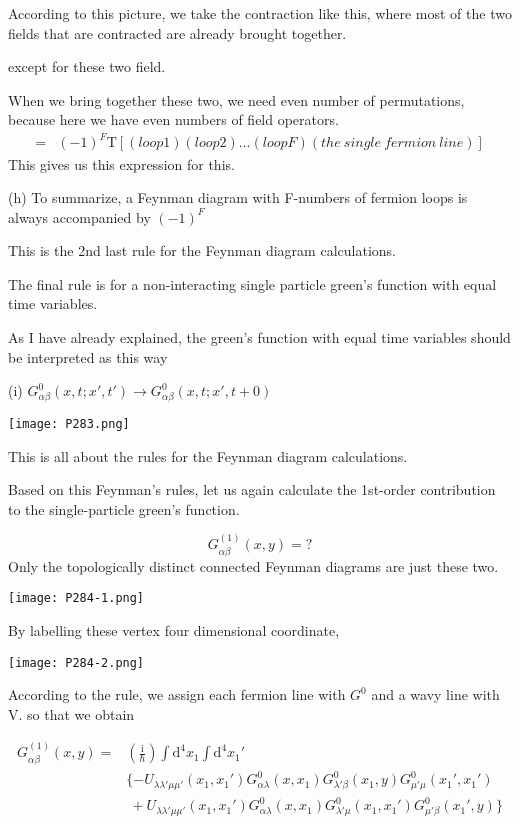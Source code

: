 According to this picture, we take the contraction like this, where most of the two fields that are contracted are already brought together.

except for these two field.

When we bring together these two, we need even number of permutations, because here we have even numbers of field operators.
\begin{align}
=&(-1)^F\mathrm{T}[(loop1)(loop2)...(loopF)(the\ single\ fermion\ line)]\nonumber
\end{align}
This gives us this expression for this.

(h) To summarize, a Feynman diagram with F-numbers of fermion loops is always accompanied by $(-1)^F$

This is the 2nd last rule for the Feynman diagram calculations.

The final rule is for a non-interacting single particle green's function with equal time variables.

As I have already explained, the green's function with equal time variables should be interpreted as this way

(i) $G_{\alpha\beta}^0(x,t;x',t')\rightarrow G_{\alpha\beta}^0(x,t;x',t+0)$

\begin{center}
\texttt{[image: P283.png]}
\end{center}


This is all about the rules for the Feynman diagram calculations.

Based on this Feynman's rules, let us again calculate the 1st-order contribution to the single-particle green's function.

$$G_{\alpha\beta}^{(1)}(x,y)=?$$
Only the topologically distinct connected Feynman diagrams are just these two.
\begin{center}
\texttt{[image: P284-1.png]}
\end{center}
By labelling these vertex four dimensional coordinate,
\begin{center}
\texttt{[image: P284-2.png]}
\end{center}

According to the rule, we assign each fermion line with $G^0$ and a wavy line with V. so that we obtain

\begin{align}\label{2.5.4}
G_{\alpha\beta}^{(1)}(x,y)=&(\frac{\mathrm{i}}{\hbar})\int \mathrm{d}^4x_1\int \mathrm{d}^4x_1' \nonumber \\
&\{-U_{\lambda\lambda'\mu\mu'}(x_1,x_1')G_{\alpha\lambda}^0(x,x_1)G_{\lambda'\beta}^0(x_1,y)G_{\mu'\mu}^0(x_1',x_1') \nonumber \\
&\ +U_{\lambda\lambda'\mu\mu'}(x_1,x_1')G_{\alpha\lambda}^0(x,x_1)G_{\lambda'\mu}^0(x_1,x_1')G_{\mu'\beta}^0(x_1',y)\} 
\end{align}

